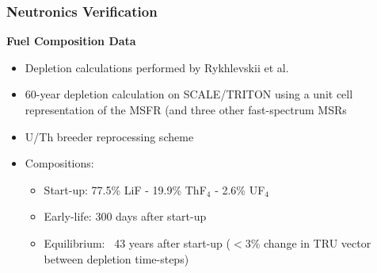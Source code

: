 \begin{frame}
	\frametitle{Neutronics Verification}
		\textbf{Fuel Composition Data}
			\begin{itemize}
				\item Depletion calculations performed by Rykhlevskii et
				al. \cite{rykhlevskii_fuel_2019}
				\item 60-year depletion calculation on SCALE/TRITON
				using a unit cell representation of the \gls{MSFR} (and
				three other fast-spectrum \glspl{MSR}
				\item U/Th breeder reprocessing scheme
				\item Compositions:
				\begin{itemize}
					\item Start-up: 77.5\% LiF - 19.9\% ThF$_4$
					- 2.6\% UF$_4$
					\item Early-life: 300 days after start-up
					\item Equilibrium: ~43 years after start-up
					($<$3\% change in TRU vector between depletion
					time-steps)
				\end{itemize}
			\end{itemize}
\end{frame}

